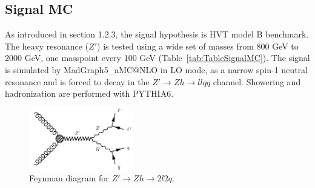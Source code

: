 \subsection{Signal MC}
As introduced in section 1.2.3, the signal hypothesis is HVT model B benchmark. The heavy resonance ($Z'$) is tested using a wide set of masses from 800 GeV to 2000 GeV, one masspoint every 100 GeV (Table~\ref{tab:TableSignalMC}). The signal is simulated by MadGraph5\_aMC$@$NLO\cite{MG5} in LO mode, as a narrow spin-1 neutral resonance and is forced to decay in the $Z'\rightarrow Zh\rightarrow llqq$ channel. Showering and hadronization are performed with PYTHIA6\cite{PYTHIA}.
\begin{figure}[hbtp]
  \begin{center}
    \includegraphics[width=0.4\textwidth]{figure/CH3/ZPrimeTo2l2q.png}
  \end{center}
  \caption{\label{fig:ZPrime2l2q}Feynman diagram for $Z'\rightarrow Zh \rightarrow 2l2q.$}
\end{figure}
